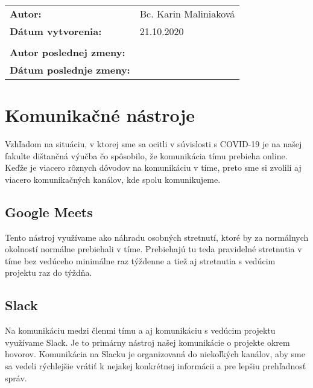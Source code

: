 \documentclass{article}
\begin{document}
    

    \begin{table}[h]
        \begin{tabular}{ll}
            \textbf{Autor:} & Bc. Karin Maliniaková \\
            \textbf{Dátum vytvorenia:} & 21.10.2020 \\
            \\
            \textbf{Autor poslednej zmeny:} &  \\
            \textbf{Dátum poslednje zmeny:} &  \\
            \hline
        \end{tabular}
        \label{tab:grades}
    \end{table}

    \section*{Komunikačné nástroje}

        \textnormal{Vzhľadom na situáciu, v ktorej sme sa ocitli v súvislosti s COVID-19 je na našej fakulte dištančná výučba čo spôsobilo, že komunikácia tímu prebieha online. Keďže je viacero rôznych dôvodov na komunikáciu v tíme, preto sme si zvolili aj viacero komunikačných kanálov, kde spolu komunikujeme.}

        \subsection*{Google Meets}

            \textnormal{Tento nástroj využívame ako náhradu osobných stretnutí, ktoré by za normálnych okolností normálne prebiehali v tíme. Prebiehajú tu teda pravidelné stretnutia v tíme bez vedúceho minimálne raz týždenne a tiež aj stretnutia s vedúcim projektu raz do týždňa.}


        \subsection*{Slack}

            \textnormal{Na komunikáciu medzi členmi tímu a aj komunikáciu s vedúcim projektu využívame Slack. Je to primárny nástroj našej komunikácie o projekte okrem hovorov. Komunikácia na Slacku je organizovaná do niekoľkých kanálov, aby sme sa vedeli rýchlejšie vrátiť k nejakej konkrétnej informácii a pre lepšiu prehľadnosť správ.}
\end{document}
